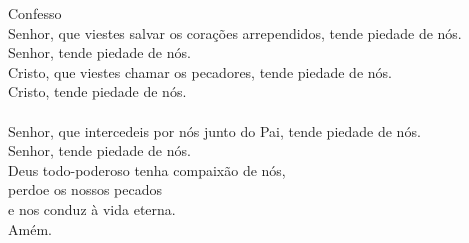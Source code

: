 \textcolor{VioletRed1}{Confesso}
\vspace{0.2cm} \\
\VbarRed{} Senhor, que viestes salvar os corações arrependidos, tende piedade de nós.\\
\RbarRed{} Senhor, tende piedade de nós.
\vspace{0.1cm} \\
\VbarRed{} Cristo, que viestes chamar os pecadores, tende piedade de nós.\\
\RbarRed{} Cristo, tende piedade de nós.\\
\vspace{0.1cm} \\
\VbarRed{} Senhor, que intercedeis por nós junto do Pai, tende piedade de nós.\\
\RbarRed{} Senhor, tende piedade de nós.
\vspace{0.1cm} \\
Deus todo-poderoso tenha compaixão de nós, \\
perdoe os nossos pecados \\
e nos conduz à vida eterna. \\
\RbarRed{} Amém.
\vspace{0.2cm} \\
